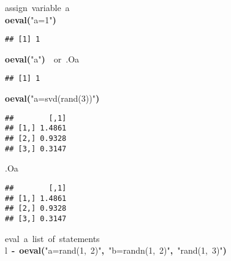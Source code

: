 \documentclass[english,10pt,a4paper]{article}\usepackage{graphicx, color}
\makeatletter
\newcommand{\hlfunctioncall}[1]{\textcolor[rgb]{0.501960784313725,0,0.329411764705882}{\textbf{#1}}}%
\newcommand{\hlstring}[1]{\textcolor[rgb]{0.6,0.6,1}{#1}}%
\newcommand{\hlkeyword}[1]{\textcolor[rgb]{0,0,0}{\textbf{#1}}}%
\newcommand{\hlcomment}[1]{\textcolor[rgb]{0.180392156862745,0.6,0.341176470588235}{#1}}%
\newcommand{\hlassignement}[1]{\textcolor[rgb]{0,0,0}{\textbf{#1}}}%
\newcommand{\hlsymbol}[1]{\textcolor[rgb]{0,0,0}{#1}}%
\newcommand{\hlstd}[1]{\textcolor[rgb]{0,0,0}{#1}}%
\newenvironment{kframe}{%
 \def\FrameCommand##1{\hskip\@totalleftmargin \hskip-\fboxsep
 \colorbox{shadecolor}{##1}\hskip-\fboxsep
     \hskip-\linewidth \hskip-\@totalleftmargin \hskip\columnwidth}%
 \MakeFramed {\advance\hsize-\width
   \@totalleftmargin\z@ \linewidth\hsize
   \@setminipage}}%
 {\par\unskip\endMakeFramed}
\newenvironment{knitrout}{}{} %
\makeatother
\begin{document}
\begin{knitrout}
\color{fgcolor}\begin{kframe}
\begin{flushleft}
\ttfamily\noindent
\hlcomment{\usebox{\hlnormalsizeboxhash}{\ }assign{\ }variable{\ }\usebox{\hlnormalsizeboxsinglequote}a\usebox{\hlnormalsizeboxsinglequote}}\hspace*{\fill}\\
\hlstd{}\hlfunctioncall{o\usebox{\hlnormalsizeboxunderscore}eval}\hlkeyword{(}\hlstring{"{}a=1"{}}\hlkeyword{)}\mbox{}
\normalfont
\end{flushleft}
\begin{verbatim}
## [1] 1
\end{verbatim}
\begin{flushleft}
\ttfamily\noindent
\hlfunctioncall{o\usebox{\hlnormalsizeboxunderscore}eval}\hlkeyword{(}\hlstring{"{}a"{}}\hlkeyword{)}{\ }{\ }\hlcomment{\usebox{\hlnormalsizeboxhash}{\ }or{\ }.O\usebox{\hlnormalsizeboxdollar}a}\mbox{}
\normalfont
\end{flushleft}
\begin{verbatim}
## [1] 1
\end{verbatim}
\begin{flushleft}
\ttfamily\noindent
\hlfunctioncall{o\usebox{\hlnormalsizeboxunderscore}eval}\hlkeyword{(}\hlstring{"{}a=svd(rand(3))"{}}\hlkeyword{)}\mbox{}
\normalfont
\end{flushleft}
\begin{verbatim}
##        [,1]
## [1,] 1.4861
## [2,] 0.9328
## [3,] 0.3147
\end{verbatim}
\begin{flushleft}
\ttfamily\noindent
\hlsymbol{.O}\hlkeyword{\usebox{\hlnormalsizeboxdollar}}\hlsymbol{a}\mbox{}
\normalfont
\end{flushleft}
\begin{verbatim}
##        [,1]
## [1,] 1.4861
## [2,] 0.9328
## [3,] 0.3147
\end{verbatim}
\begin{flushleft}
\ttfamily\noindent
\hlcomment{\usebox{\hlnormalsizeboxhash}{\ }eval{\ }a{\ }list{\ }of{\ }statements}\hspace*{\fill}\\
\hlstd{}\hlsymbol{l}{\ }\hlassignement{\usebox{\hlnormalsizeboxlessthan}-}{\ }\hlfunctioncall{o\usebox{\hlnormalsizeboxunderscore}eval}\hlkeyword{(}\hlstring{"{}a=rand(1,{\ }2)"{}}\hlkeyword{,}{\ }\hlstring{"{}b=randn(1,{\ }2)"{}}\hlkeyword{,}{\ }\hlstring{"{}rand(1,{\ }3)"{}}\hlkeyword{)}\hspace*{\fill}\\

\end{flushleft}
\end{kframe}
\end{knitrout}
\end{document}
